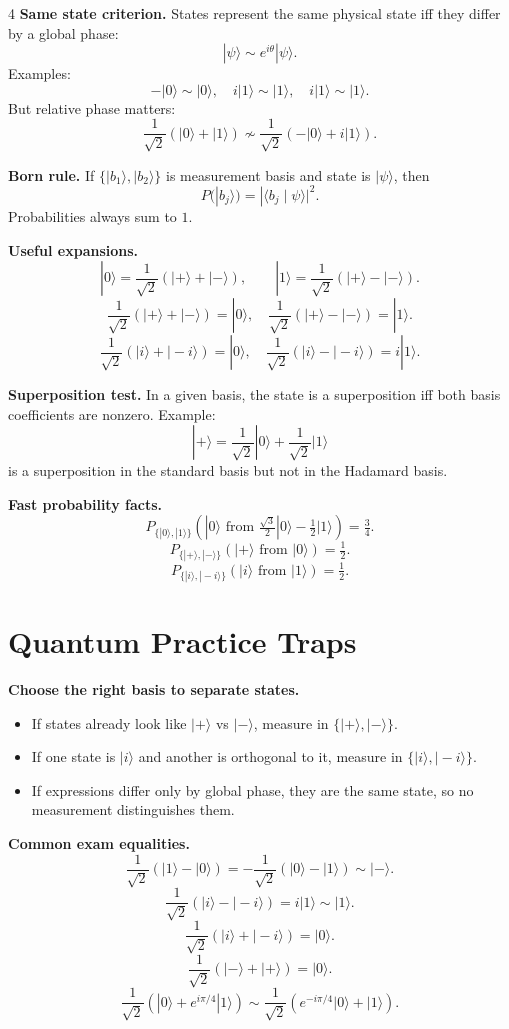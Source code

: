 \documentclass[letterpaper]{article}
\newcommand{\ket}[1]{|#1\rangle}
\newcommand{\braket}[2]{\langle #1 \mid #2\rangle}
\newcommand{\smallhead}[1]{{\bfseries #1}}
\begin{document}
\begin{multicols*}{4}
\smallhead{Same state criterion.} States represent the same physical state iff they differ by a global phase:
\[
\ket{\psi}\sim e^{i\theta}\ket{\psi}.
\]
Examples:
\[
-\ket0\sim \ket0,\quad i\ket1\sim \ket1,\quad i\ket1\sim \ket1.
\]
But relative phase matters:
\[
\frac{1}{\sqrt2}(\ket0+\ket1)\not\sim \frac{1}{\sqrt2}(-\ket0+i\ket1).
\]

\smallhead{Born rule.} If $\{\ket{b_1},\ket{b_2}\}$ is measurement basis and state is $\ket{\psi}$, then
\[
P(\ket{b_j})=|\braket{b_j}{\psi}|^2.
\]
Probabilities always sum to $1$.

\smallhead{Useful expansions.}
\[
\ket0=\frac{1}{\sqrt2}(\ket+ + \ket-),\qquad
\ket1=\frac{1}{\sqrt2}(\ket+ - \ket-).
\]
\[
\frac{1}{\sqrt2}(\ket+ + \ket-)=\ket0,\quad
\frac{1}{\sqrt2}(\ket+ - \ket-)=\ket1.
\]
\[
\frac{1}{\sqrt2}(\ket{i}+\ket{-i})=\ket0,\quad
\frac{1}{\sqrt2}(\ket{i}-\ket{-i})=i\ket1.
\]

\smallhead{Superposition test.} In a given basis, the state is a superposition iff both basis coefficients are nonzero. Example:
\[
\ket+ = \frac{1}{\sqrt2}\ket0+\frac{1}{\sqrt2}\ket1
\]
is a superposition in the standard basis but not in the Hadamard basis.

\smallhead{Fast probability facts.}
\[
P_{\{\ket0,\ket1\}}(\ket0 \text{ from } \tfrac{\sqrt3}{2}\ket0-\tfrac12\ket1)=\tfrac34.
\]
\[
P_{\{\ket+,\ket-\}}(\ket+ \text{ from } \ket0)=\tfrac12.
\]
\[
P_{\{\ket{i},\ket{-i}\}}(\ket{i}\text{ from }\ket1)=\tfrac12.
\]

\section{Quantum Practice Traps}
\smallhead{Choose the right basis to separate states.}
\begin{itemize}
\item If states already look like $\ket+$ vs $\ket-$, measure in $\{\ket+,\ket-\}$.
\item If one state is $\ket{i}$ and another is orthogonal to it, measure in $\{\ket{i},\ket{-i}\}$.
\item If expressions differ only by global phase, they are the same state, so no measurement distinguishes them.
\end{itemize}

\smallhead{Common exam equalities.}
\[
\frac{1}{\sqrt2}(\ket1-\ket0)=-\frac{1}{\sqrt2}(\ket0-\ket1)\sim \ket-.
\]
\[
\frac{1}{\sqrt2}(\ket{i}-\ket{-i})=i\ket1\sim\ket1.
\]
\[
\frac{1}{\sqrt2}(\ket{i}+\ket{-i})=\ket0.
\]
\[
\frac{1}{\sqrt2}(\ket-+\ket+)=\ket0.
\]
\[
\frac{1}{\sqrt2}(\ket0+e^{i\pi/4}\ket1)\sim
\frac{1}{\sqrt2}(e^{-i\pi/4}\ket0+\ket1).
\]


\end{multicols*}
\end{document}
